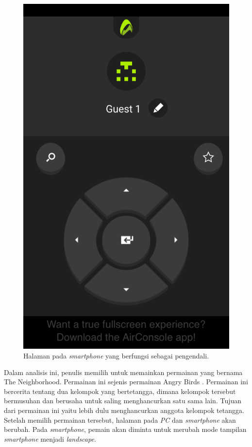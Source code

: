 \documentclass[a4paper,twoside]{article}
\begin{document}
\begin{enumerate}
		\begin{figure}[H]
			\centering
			\includegraphics[scale=0.3]{Gambar/air4_play1}
			\caption{Halaman pada \textit{smartphone} yang berfungsi sebagai pengendali.}
			\label{fig:22_air4_play1}
		\end{figure}
		
		Dalam analisis ini, penulis memilih untuk memainkan permainan yang bernama The Neighborhood. Permainan ini sejenis permainan Angry Birds \cite{angrybirds}. Permainan ini bercerita tentang dua kelompok yang bertetangga, dimana kelompok tersebut bermusuhan dan berusaha untuk saling menghancurkan satu sama lain. Tujuan dari permainan ini yaitu lebih dulu menghancurkan anggota kelompok tetangga. Setelah memilih permainan tersebut, halaman pada \textit{PC} dan \textit{smartphone} akan berubah. Pada \textit{smartphone}, pemain akan diminta untuk merubah mode tampilan \textit{smartphone} menjadi \textit{landscape}.
		

\end{enumerate}
\end{document}
